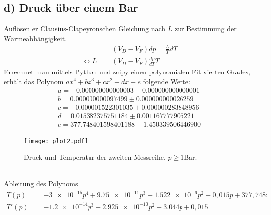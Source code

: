\subsection{d) Druck über einem Bar}
Auflösen er Clausius-Clapeyronschen Gleichung nach $L$ zur Bestimmung der Wärmeabhängigkeit.\\
\begin{align}
  &(V_D-V_F)dp=\frac{L}{T}dT\nonumber\\
  \Leftrightarrow L=&(V_D-V_F)\frac{dp}{dT}T
\end{align}
Errechnet man mittels Python und scipy einen polynomialen Fit vierten Grades, erhält das Polynom $ax^4+bx^3+cx^2+dx+e$ folgende Werte:
\begin{align*}
a = -0.000000000000003 ± 0.000000000000001\\
b = 0.000000000097499 ± 0.000000000026259\\
c = -0.000001522301035 ± 0.000000283848956\\
d = 0.015382375751184 ± 0.001167777905221\\
e = 377.748401598401188 ± 1.450339506446900
\end{align*}
\begin{figure}[h]
    \centering
    \texttt{[image: plot2.pdf]}
    \caption{Druck und Temperatur der zweiten Messreihe, $p\geq 1$Bar.}
\end{figure}
\\
Ableitung des Polynoms 
\begin{align}
T(p)&=-\num{3e-15}p^4+\num{9.75e-11}p^3-\num{1.522e-6}p^2+0,015p+377,748:\nonumber\\
T'(p)&=-\num{1.2e-14}p^3+\num{2.925e-10}p^2-\num{3.044}p+0,015
\end{align}